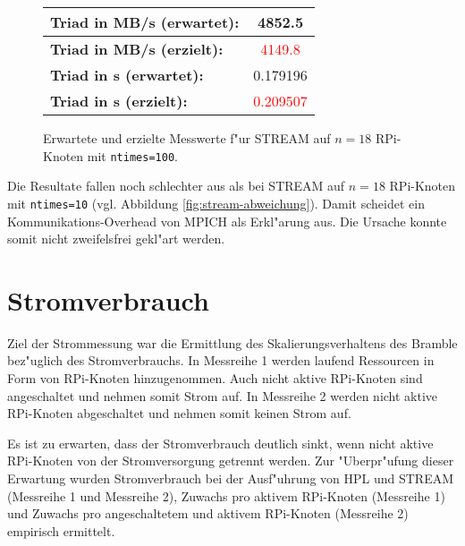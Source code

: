 \begin{enumerate}
\begin{figure}[H]
\begin{tabular}{|l|c|}
    \hline 
    \textbf{Triad in MB/s (erwartet):} & 4852.5\\
    \hline 
    \textbf{Triad in MB/s (erzielt):} & \textcolor{red}{4149.8}\\
    \hline 
    \textbf{Triad in s (erwartet):} & 0.179196\\
    \hline 
    \textbf{Triad in s (erzielt):} & \textcolor{red}{0.209507}\\
    \hline 
  \end{tabular}
  \caption{Erwartete und erzielte Messwerte f"ur STREAM auf $n=18$ RPi-Knoten mit \texttt{ntimes=100}.}\label{fig:stream-ntimes100}
\end{figure}
\noindent
Die Resultate fallen noch schlechter aus als bei STREAM auf $n=18$ RPi-Knoten mit \texttt{ntimes=10} (vgl. Abbildung \ref{fig:stream-abweichung}). Damit scheidet ein Kommunikations-Overhead von MPICH als Erkl"arung aus. Die Ursache konnte somit nicht zweifelsfrei gekl"art werden. 
\end{enumerate}
\clearpage
\section{Stromverbrauch}
Ziel der Strommessung war die Ermittlung des Skalierungsverhaltens des Bramble bez"uglich des Stromverbrauchs. In Messreihe 1 werden laufend Ressourcen in Form von RPi-Knoten hinzugenommen. Auch nicht aktive RPi-Knoten sind angeschaltet und nehmen somit Strom auf. In Messreihe 2 werden nicht aktive RPi-Knoten abgeschaltet und nehmen somit keinen Strom auf. 

Es ist zu erwarten, dass der Stromverbrauch deutlich sinkt, wenn nicht aktive RPi-Knoten von der Stromversorgung getrennt werden. Zur "Uberpr"ufung dieser Erwartung wurden Stromverbrauch bei der Ausf"uhrung von HPL und STREAM (Messreihe 1 und Messreihe 2), Zuwachs pro aktivem RPi-Knoten (Messreihe 1) und Zuwachs pro angeschaltetem und aktivem RPi-Knoten (Messreihe 2) empirisch ermittelt. 

